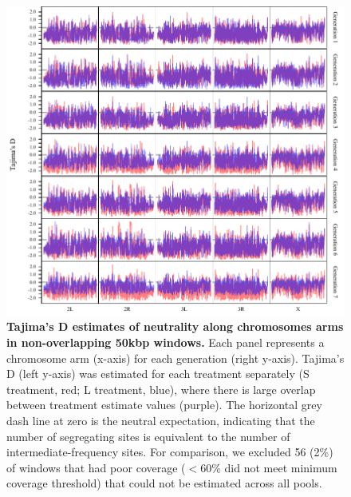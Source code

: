 \begin{figure}[!htb]
    \centering
    \includegraphics[width=1\textwidth]{Supp/Chp4_DNA/TajimasD_Chrom.pdf}
\caption[Tajima’s D estimates of neutrality along chromosomes arms in non-overlapping 50kbp windows. ]{\textbf{Tajima’s D estimates of neutrality along chromosomes arms in non-overlapping 50kbp windows.} Each panel represents a chromosome arm (x-axis) for each generation (right y-axis). Tajima’s D (left y-axis) was estimated for each treatment separately (S treatment, red; L treatment, blue), where there is large overlap between treatment estimate values (purple). The horizontal grey dash line at zero is the neutral expectation, indicating that the number of segregating sites is equivalent to the number of intermediate-frequency sites. For comparison, we excluded 56 (2\%) of windows that had poor coverage ($< 60\%$ did not meet minimum coverage threshold) that could not be estimated across all pools.}
    \label{fig:DNAsuppTajD}
\end{figure}

\FloatBarrier

